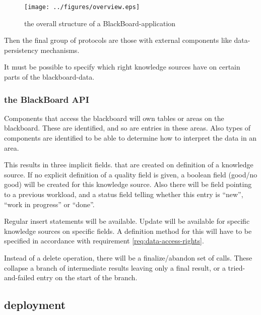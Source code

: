 \documentclass[]{lofar}
\begin{document}
      \begin{figure}
        \texttt{[image: ../figures/overview.eps]}
        \hypertarget{fig:overview}{}
        \caption{the overall structure of a BlackBoard-application\label{fig:overview}}
      \end{figure}

      Then the final group of protocols are those with external
      components like data-persistency mechanisms.

      \begin{requirement}
        It must be possible to specify which right knowledge sources
        have on certain parts of the blackboard-data.
        \caption{data access rights\label{req:data-access-rights}}
        \hypertarget{req:data-access-rights}{}
      \end{requirement}

      \subsubsection{the BlackBoard API}

        Components that access the blackboard will own tables or areas
        on the blackboard. These are identified, and so are entries in
        these areas. Also types of components are identified to be
        able to determine how to interpret the data in an area.

        This results in three implicit fields. that are created on
        definition of a knowledge source. If no explicit definition of
        a quality field is given, a boolean field (good/no good) will
        be created for this knowledge source. Also there will be field
        pointing to a previous workload, and a status field telling
        whether this entry is ``new'', ``work in progress'' or ``done''.

        Regular insert statements will be available. Update will be
        available for specific knowledge sources on specific fields. A
        definition method for this will have to be specified in
        accordance with requirement
        \hyperlink{req:data-access-rights}{\ref{req:data-access-rights}}.

        Instead of a delete operation, there will be a
        finalize/abandon set of calls. These collapse a branch of
        intermediate results leaving only a final result, or a
        tried-and-failed entry on the start of the branch.

    \subsection{deployment}
\end{document}
